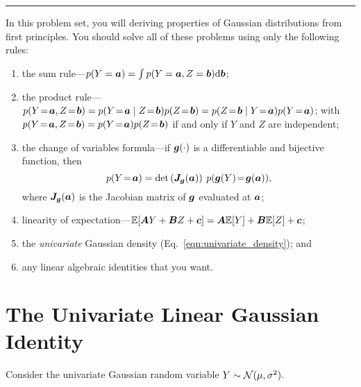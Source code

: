 \documentclass[11pt,letterpaper]{article}
\newcommand{\sectionbreak}{%
  \vspace{1em}
  \hrule
}
\begin{document}
\sectionbreak

In this problem set, you will deriving properties of Gaussian distributions from first principles.
You should solve all of these problems using only the following rules:
\begin{enumerate}
  \item the sum rule---$p(Y={\bm{a}}) = \int p(Y={\bm{a}}, Z={\bm{b}}) \textrm{d} {\bm{b}}$;
  \item the product rule---$p(Y\!=\!\va, Z\!=\!\vb) = p(Y\!=\!\va \mid Z\!=\!\vb) p(Z\!=\!\vb) = p(Z\!=\!\vb \mid Y\!=\!\va) p(Y\!=\!\va)$;
    with $p(Y\!=\!\va, Z\!=\!\vb) = p(Y\!=\!\va) p(Z\!=\!\vb)$ if and only if $Y$ and $Z$ are independent;
  \item the change of variables formula---if ${\bm{g}}(\cdot)$ is a differentiable and bijective function, then
    $$p(Y\!=\!{\bm{a}}) = \det \left( {\bm{J}}_{{\bm{g}}}({\bm{a}}) \right) \: p({\bm{g}}(Y)\!=\!{\bm{g}}({\bm{a}})),$$
    where ${\bm{J}}_{\bm{g}}({\bm{a}})$ is the Jacobian matrix of ${\bm{g}}$ evaluated at ${\bm{a}}$;
  \item linearity of expectation---$\mathbb{E}[ {\bm{A}} Y + {\bm{B}} Z + {\bm{c}} ] = {\bm{A}} \mathbb{E}[Y] + {\bm{B}} \mathbb{E}[Z] + {\bm{c}}$;
  \item the \emph{univariate} Gaussian density (Eq.~\ref{eqn:univariate_density}); and
  \item any linear algebraic identities that you want.
\end{enumerate}


\clearpage

\section{The Univariate Linear Gaussian Identity}

Consider the univariate Gaussian random variable $Y \sim \mathcal{N}(\mu, \sigma^2)$.
\end{document}
